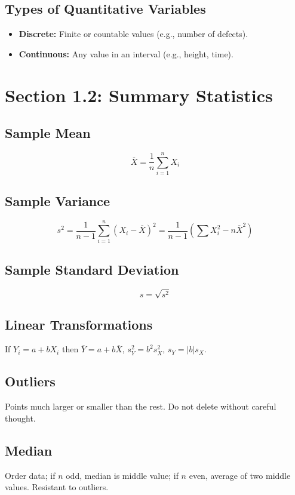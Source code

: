 \documentclass[11pt]{article}
\begin{document}
\subsection*{Types of Quantitative Variables}
\begin{itemize}[nosep]
    \item \textbf{Discrete:} Finite or countable values (e.g., number of defects).
    \item \textbf{Continuous:} Any value in an interval (e.g., height, time).
\end{itemize}

\section*{Section 1.2: Summary Statistics}
\subsection*{Sample Mean}
\[
\overline{X} = \frac{1}{n}\sum_{i=1}^{n} X_i
\]

\subsection*{Sample Variance}
\[
s^2 = \frac{1}{n-1}\sum_{i=1}^{n}(X_i-\overline{X})^2 = \frac{1}{n-1}\left(\sum X_i^2 - n\overline{X}^2\right)
\]

\subsection*{Sample Standard Deviation}
\[
s = \sqrt{s^2}
\]

\subsection*{Linear Transformations}
If \(Y_i = a + bX_i\) then \(\overline{Y}=a+b\overline{X}\), \(s_Y^2=b^2 s_X^2\), \(s_Y=|b|s_X\).

\subsection*{Outliers}
Points much larger or smaller than the rest. Do not delete without careful thought.

\subsection*{Median}
Order data; if \(n\) odd, median is middle value; if \(n\) even, average of two middle values. Resistant to outliers.
\end{document}
